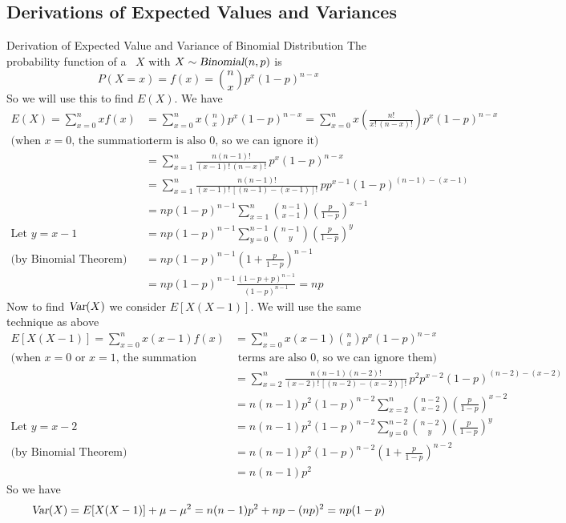\subsection{Derivations of Expected Values and Variances}
\pagebreak[3]
\begin{theory}{Derivation of Expected Value and Variance of Binomial Distribution}
The probability function of a \rv~$X$ with $X \sim \operatorname{\textsl{Binomial}}(n,p)$ is
\[
    P(X = x) = f(x) = \binom{n}{x}p^x(1-p)^{n-x}
\]
So we will use this to find $E(X)$. We have
\begin{align*}
    E(X) = \sum_{x = 0}^{n} xf(x) 
    &= \sum_{x = 0}^{n} x \binom{n}{x}p^x(1-p)^{n-x}
    = \sum_{x = 0}^{n} x\left(\frac{n!}{x!\,(n-x)!}\right) p^x (1-p)^{n-x} \\
    \text{(when $x = 0$, the summation}&\text{ term is also 0, so we can ignore it)} \\
    &= \sum_{x = 1}^{n} \frac{n(n-1)!}{(x-1)!\,(n-x)!}\,p^x (1-p)^{n-x} \\
    &= \sum_{x = 1}^{n} \frac{n(n-1)!}{(x-1)!\,[(n-1)-(x-1)]!} \,pp^{x-1} (1-p)^{(n-1)-(x-1)} \\
    &= np(1-p)^{n-1} \sum_{x = 1}^{n} \binom{n-1}{x-1} \left(\frac{p}{1-p}\right)^{x-1} \\
    \text{Let $y = x - 1$} \qquad
    &= np(1-p)^{n-1} \sum_{y = 0}^{n-1} \binom{n-1}{y} \left(\frac{p}{1-p}\right)^{y} \\
    \text{(by Binomial Theorem)} \qquad
    &= np(1-p)^{n-1} \left(1 + \frac{p}{1-p}\right)^{n-1} \\
    &= np (1-p)^{n-1} \frac{(1-p+p)^{n-1}}{(1-p)^{n-1}}
    = np
\end{align*}
Now to find $\operatorname{\textsl{Var}}(X)$ we consider $E[X(X-1)]$. We will use the same technique as above
\begin{align*}
    E[X(X-1)] = \sum_{x = 0}^{n} x(x-1)f(x)
    &= \sum_{x = 0}^{n} x(x-1) \binom{n}{x}p^x(1-p)^{n-x} \\
    \text{(when $x = 0$ or $x = 1$, the summation}&\text{ terms are also 0, so we can ignore them)} \\
    &= \sum_{x = 2}^{n} \frac{n(n-1)(n-2)!}{(x-2)!\,[(n-2)-(x-2)]!} \,p^2p^{x-2} (1-p)^{(n-2)-(x-2)} \\
    &= n(n-1)p^2(1-p)^{n-2} \sum_{x = 2}^{n} \binom{n-2}{x-2} \left(\frac{p}{1-p}\right)^{x-2} \\
    \text{Let $y = x - 2$} \qquad
    &= n(n-1)p^2(1-p)^{n-2} \sum_{y = 0}^{n - 2} \binom{n-2}{y} \left(\frac{p}{1-p}\right)^{y} \\
    \text{(by Binomial Theorem)} \qquad &= n(n-1)p^2(1-p)^{n-2} \left(1 + \frac{p}{1-p}\right)^{n-2} \\
    &= n(n-1)p^2
\end{align*}
So we have
\[
    \operatorname{\textsl{Var}}(X) = E[X(X-1)] + \mu - \mu^2 = n(n-1)p^2 + np - (np)^2 = np(1-p)
\]
\end{theory}
